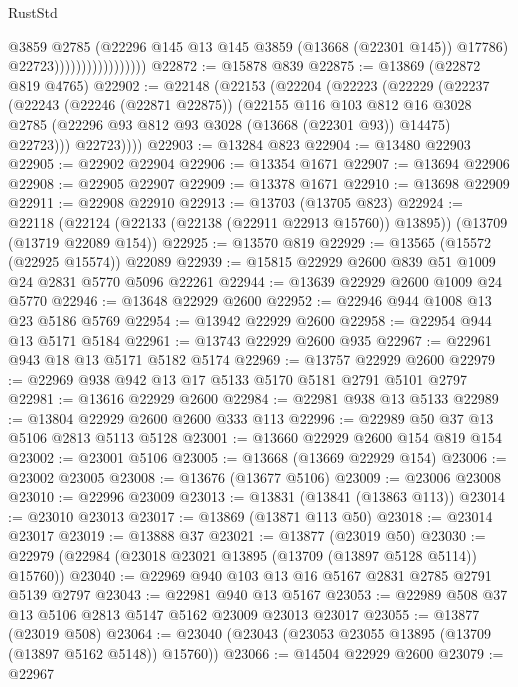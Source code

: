 \begin{lexlean}{RustStd}
\begin{coremodule}
                                      @3859
                                      @2785
                                      (@22296 @145 @13 @145 @3859 (@13668 (@22301 @145)) @17786)
                                      @22723)))))))))))))))))
@22872 := @15878 @839
@22875 := @13869 (@22872 @819 @4765)
@22902 := @22148
    (@22153
      (@22204
        (@22223
          (@22229
            (@22237
              (@22243
                (@22246 (@22871 @22875))
                (@22155
                  @116
                  @103
                  @812
                  @16
                  @3028
                  @2785
                  (@22296 @93 @812 @93 @3028 (@13668 (@22301 @93)) @14475)
                  @22723)))
            @22723))))
@22903 := @13284 @823
@22904 := @13480 @22903
@22905 := @22902 @22904
@22906 := @13354 @1671
@22907 := @13694 @22906
@22908 := @22905 @22907
@22909 := @13378 @1671
@22910 := @13698 @22909
@22911 := @22908 @22910
@22913 := @13703 (@13705 @823)
@22924 := @22118
    (@22124 (@22133 (@22138 (@22911 @22913 @15760)) @13895))
    (@13709 (@13719 @22089 @154))
@22925 := @13570 @819
@22929 := @13565 (@15572 (@22925 @15574)) @22089
@22939 := @15815 @22929 @2600 @839 @51 @1009 @24 @2831 @5770 @5096 @22261
@22944 := @13639 @22929 @2600 @1009 @24 @5770
@22946 := @13648 @22929 @2600
@22952 := @22946 @944 @1008 @13 @23 @5186 @5769
@22954 := @13942 @22929 @2600
@22958 := @22954 @944 @13 @5171 @5184
@22961 := @13743 @22929 @2600 @935
@22967 := @22961 @943 @18 @13 @5171 @5182 @5174
@22969 := @13757 @22929 @2600
@22979 := @22969 @938 @942 @13 @17 @5133 @5170 @5181 @2791 @5101 @2797
@22981 := @13616 @22929 @2600
@22984 := @22981 @938 @13 @5133
@22989 := @13804 @22929 @2600 @2600 @333 @113
@22996 := @22989 @50 @37 @13 @5106 @2813 @5113 @5128
@23001 := @13660 @22929 @2600 @154 @819 @154
@23002 := @23001 @5106
@23005 := @13668 (@13669 @22929 @154)
@23006 := @23002 @23005
@23008 := @13676 (@13677 @5106)
@23009 := @23006 @23008
@23010 := @22996 @23009
@23013 := @13831 (@13841 (@13863 @113))
@23014 := @23010 @23013
@23017 := @13869 (@13871 @113 @50)
@23018 := @23014 @23017
@23019 := @13888 @37
@23021 := @13877 (@23019 @50)
@23030 := @22979 (@22984 (@23018 @23021 @13895 (@13709 (@13897 @5128 @5114)) @15760))
@23040 := @22969 @940 @103 @13 @16 @5167 @2831 @2785 @2791 @5139 @2797
@23043 := @22981 @940 @13 @5167
@23053 := @22989 @508 @37 @13 @5106 @2813 @5147 @5162 @23009 @23013 @23017
@23055 := @13877 (@23019 @508)
@23064 := @23040 (@23043 (@23053 @23055 @13895 (@13709 (@13897 @5162 @5148)) @15760))
@23066 := @14504 @22929 @2600
@23079 := @22967

\end{coremodule}
\end{lexlean}

